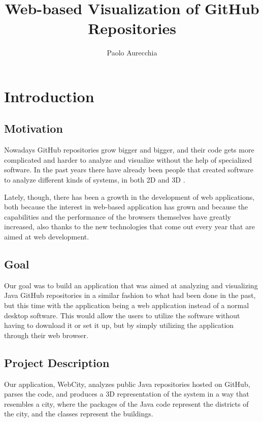 \documentclass[]{usiinfbachelorproject}
\author{Paolo Aurecchia}
\title{Web-based Visualization of GitHub Repositories}
\subtitle{}
\begin{document}
\maketitle

\section{Introduction} \label{introduction}

\subsection{Motivation} \label{Motivation}
Nowadays GitHub repositories grow bigger and bigger, and their code gets more complicated and harder to analyze and visualize without the help of specialized software. In the past years there have already been people that created software to analyze different kinds of systems, in both 2D and 3D \cite{Wett07b} \cite{Wett2008b} \cite{Wett2008a}.

Lately, though, there has been a growth in the development of web applications, both because the interest in web-based application has grown and because the capabilities and the performance of the browsers themselves have greatly increased, also thanks to the new technologies that come out every year that are aimed at web development.

\subsection{Goal} \label{Goal}
Our goal was to build an application that was aimed at analyzing and visualizing Java GitHub repositories in a similar fashion to what had been done in the past, but this time with the application being a web application instead of a normal desktop software. This would allow the users to utilize the software without having to download it or set it up, but by simply utilizing the application through their web browser.

\subsection{Project Description} \label{Project Description}
Our application, WebCity, analyzes public Java repositories hosted on GitHub, parses the code, and produces a 3D representation of the system in a way that resembles a city, where the packages of the Java code represent the districts of the city, and the classes represent the buildings.
\end{document}
